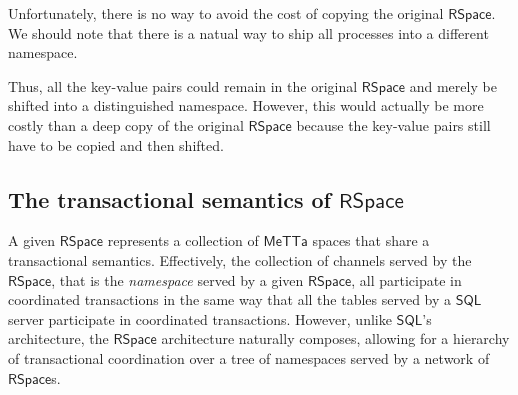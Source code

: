 Unfortunately, there is no way to avoid the cost of copying the
original $\mathsf{RSpace}$. We should note that there is a natual way
to ship all processes into a different namespace.


Thus, all the key-value pairs could remain in the original
$\mathsf{RSpace}$ and merely be shifted into a distinguished
namespace. However, this would actually be more costly than a deep
copy of the original $\mathsf{RSpace}$ because the key-value pairs
still have to be copied and then shifted.

\subsection{The transactional semantics of $\mathsf{RSpace}$}

A given $\mathsf{RSpace}$ represents a collection of $\mathsf{MeTTa}$
spaces that share a transactional semantics. Effectively, the
collection of channels served by the $\mathsf{RSpace}$, that is the
\emph{namespace} served by a given $\mathsf{RSpace}$, all participate
in coordinated transactions in the same way that all the tables served
by a $\mathsf{SQL}$ server participate in coordinated
transactions. However, unlike $\mathsf{SQL}$'s architecture, the
$\mathsf{RSpace}$ architecture naturally composes, allowing for a
hierarchy of transactional coordination over a tree of namespaces served by a network of $\mathsf{RSpace}$s.
